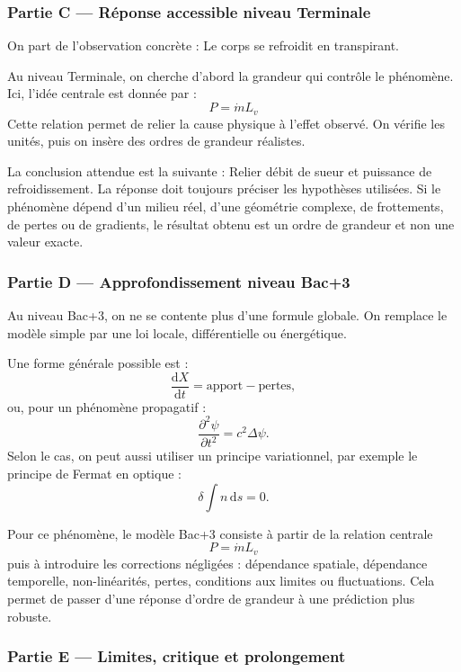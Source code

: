 \documentclass[11pt,a4paper]{article}
\begin{document}
\subsubsection*{Partie C — Réponse accessible niveau Terminale}

\begin{corrigebox}
On part de l'observation concrète : Le corps se refroidit en transpirant.

Au niveau Terminale, on cherche d'abord la grandeur qui contrôle le phénomène. Ici, l'idée centrale est donnée par :
\[
P=\dot mL_v
\]
Cette relation permet de relier la cause physique à l'effet observé. On vérifie les unités, puis on insère des ordres de grandeur réalistes.

La conclusion attendue est la suivante : Relier débit de sueur et puissance de refroidissement. La réponse doit toujours préciser les hypothèses utilisées. Si le phénomène dépend d'un milieu réel, d'une géométrie complexe, de frottements, de pertes ou de gradients, le résultat obtenu est un ordre de grandeur et non une valeur exacte.
\end{corrigebox}

\subsubsection*{Partie D — Approfondissement niveau Bac+3}

\begin{approfondissementbox}
Au niveau Bac+3, on ne se contente plus d'une formule globale. On remplace le modèle simple par une loi locale, différentielle ou énergétique.

Une forme générale possible est :
\[
\frac{\mathrm d X}{\mathrm dt}=\text{apport}-\text{pertes},
\]
ou, pour un phénomène propagatif :
\[
\frac{\partial^2 \psi}{\partial t^2}=c^2\Delta\psi.
\]
Selon le cas, on peut aussi utiliser un principe variationnel, par exemple le principe de Fermat en optique :
\[
\delta \int n\,\mathrm ds=0.
\]

Pour ce phénomène, le modèle Bac+3 consiste à partir de la relation centrale
\[
P=\dot mL_v
\]
puis à introduire les corrections négligées : dépendance spatiale, dépendance temporelle, non-linéarités, pertes, conditions aux limites ou fluctuations. Cela permet de passer d'une réponse d'ordre de grandeur à une prédiction plus robuste.
\end{approfondissementbox}

\subsubsection*{Partie E — Limites, critique et prolongement}
\end{document}
